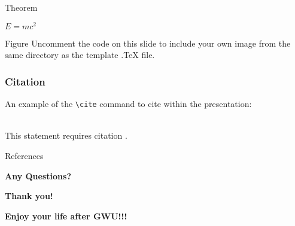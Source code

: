 \documentclass[aspectratio=169,xcolor=dvipsnames]{beamer}
\begin{document}
\begin{frame}{Theorem}
    \begin{theorem}
        $E = mc^2$
    \end{theorem}
\end{frame}


\begin{frame}{Figure}
    Uncomment the code on this slide to include your own image from the same directory as the template .TeX file.
\end{frame}


\begin{frame}[fragile] %
    \frametitle{Citation}
    An example of the \verb|\cite| command to cite within the presentation:\\~

    This statement requires citation \cite{p1}.
\end{frame}


\begin{frame}{References}
    \footnotesize
    
    
\end{frame}


\begin{frame}
    \Huge{\centerline{\textbf{Any Questions?}}}
\end{frame}


\begin{frame}
    \Huge{\centerline{\textbf{Thank you!}}}
    \Huge{\centerline{\textbf{Enjoy your life after GWU!!!}}}
\end{frame}

\end{document}

